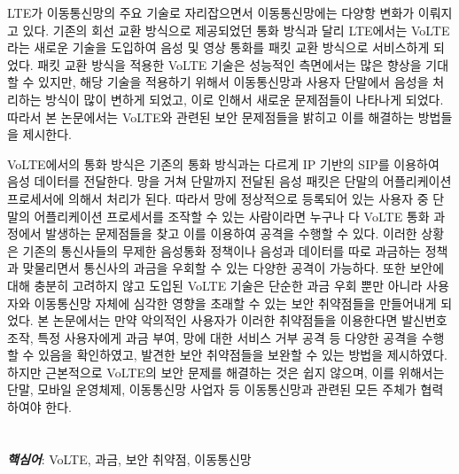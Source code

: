 \begin{summary}
LTE가 이동통신망의 주요 기술로 자리잡으면서 이동통신망에는 다양항 변화가
이뤄지고 있다. 기존의 회선 교환 방식으로 제공되었던 통화 방식과 달리 LTE에서는
VoLTE라는 새로운 기술을 도입하여 음성 및 영상 통화를 패킷 교환 방식으로
서비스하게 되었다. 패킷 교환 방식을 적용한 VoLTE 기술은 성능적인 측면에서는 많은
향상을 기대할 수 있지만, 해당 기술을 적용하기 위해서 이동통신망과 사용자
단말에서 음성을 처리하는 방식이 많이 변하게 되었고, 이로 인해서 새로운
문제점들이 나타나게 되었다. 따라서 본 논문에서는 VoLTE와 관련된 보안 문제점들을
밝히고 이를 해결하는 방법들을 제시한다.

VoLTE에서의 통화 방식은 기존의 통화 방식과는 다르게 IP 기반의 SIP를 이용하여
음성 데이터를 전달한다. 망을 거쳐 단말까지 전달된 음성 패킷은 단말의
어플리케이션 프로세서에 의해서 처리가 된다. 따라서 망에 정상적으로 등록되어 있는
사용자 중 단말의 어플리케이션 프로세서를 조작할 수 있는 사람이라면 누구나 다
VoLTE 통화 과정에서 발생하는 문제점들을 찾고 이를 이용하여 공격을 수행할 수
있다. 이러한 상황은 기존의 통신사들의 무제한 음성통화 정책이나 음성과 데이터를
따로 과금하는 정책과 맞물리면서 통신사의 과금을 우회할 수 있는 다양한 공격이
가능하다. 또한 보안에 대해 충분히 고려하지 않고 도입된 VoLTE 기술은 단순한 과금
우회 뿐만 아니라 사용자와 이동통신망 자체에 심각한 영향을 초래할 수 있는 보안
취약점들을 만들어내게 되었다. 본 논문에서는 만약 악의적인 사용자가 이러한
취약점들을 이용한다면 발신번호 조작, 특정 사용자에게 과금 부여, 망에 대한 서비스
거부 공격 등 다양한 공격을 수행할 수 있음을 확인하였고, 발견한 보안 취약점들을
보완할 수 있는 방법을 제시하였다.  하지만 근본적으로 VoLTE의 보안 문제를
해결하는 것은 쉽지 않으며, 이를 위해서는 단말, 모바일 운영체제, 이동통신망
사업자 등 이동통신망과 관련된 모든 주체가 협력하여야 한다.
\\
\\
\\
\textbf{\textit{핵심어}}: VoLTE, 과금, 보안 취약점, 이동통신망

\end{summary}
